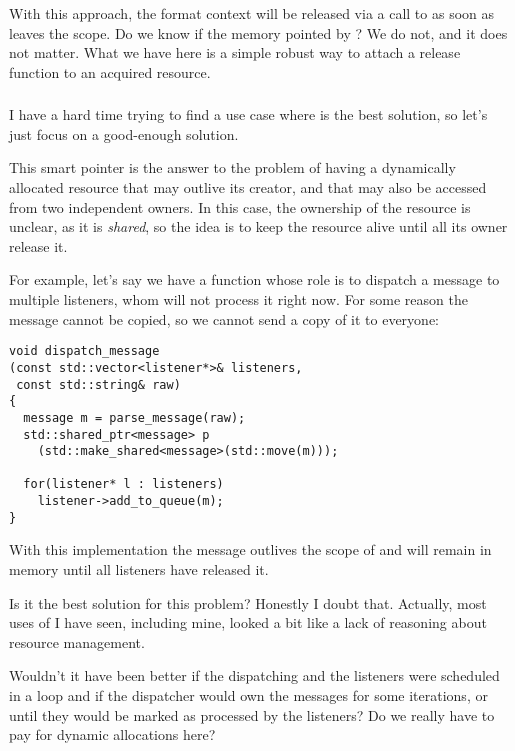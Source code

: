 With this approach, the format context will be released via a call to
 as soon as
 leaves the scope. Do we know if the memory
pointed by ? We do not, and it does not
matter. What we have here is a simple robust way to attach a release
function to an acquired resource.

\subsubsection{}

I have a hard time trying to find a use case where
 is the best solution, so let's just focus on a
good-enough solution.

This smart pointer is the answer to the problem of having a
dynamically allocated resource that may outlive its creator, and that
may also be accessed from two independent owners. In this case, the
ownership of the resource is unclear, as it is \emph{shared}, so the
idea is to keep the resource alive until all its owner release it.

For example, let's say we have a function whose role is to dispatch a
message to multiple listeners, whom will not process it right now. For
some reason the message cannot be copied, so we cannot send a copy of
it to everyone:

\begin{lstlisting}
void dispatch_message
(const std::vector<listener*>& listeners,
 const std::string& raw)
{
  message m = parse_message(raw);
  std::shared_ptr<message> p
    (std::make_shared<message>(std::move(m)));

  for(listener* l : listeners)
    listener->add_to_queue(m);
}
\end{lstlisting}

With this implementation the message outlives the scope of
 and will remain in memory until all
listeners have released it.

Is it the best solution for this problem? Honestly I doubt
that. Actually, most uses of  I have seen,
including mine, looked a bit like a lack of reasoning about resource
management.

Wouldn't it have been better if the dispatching and the listeners were
scheduled in a loop and if the dispatcher would own the messages for
some iterations, or until they would be marked as processed by the
listeners? Do we really have to pay for dynamic allocations here?

